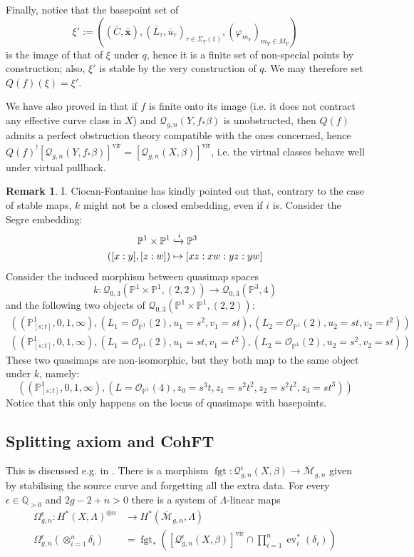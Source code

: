 \documentclass[11pt]{amsart}
\newcommand{\oM}{\overline{\mathcal{M}}}
\newcommand{\Q}[4]{\mathcal{Q}_{#1,#2}(#3,#4)}
\newcommand{\Qe}[4]{\mathcal{Q}^{\epsilon}_{#1,#2}(#3,#4)}
\newcommand{\PP}{\mathbb P}
\newcommand{\QQ}{\mathbb{Q}}
\newcommand{\OO}{\mathcal{O}}
\renewcommand{\to}{\rightarrow}
\newcommand{\virt}[1]{[#1]^{\operatorname{vir}}}
\newcommand{\fgt}{\operatorname{fgt}}
\newcommand{\ev}{\operatorname{ev}}
\theoremstyle{definition}
\theoremstyle{definition}
\newtheorem{rmk}[thm]{Remark}
\begin{document}
Finally, notice that the basepoint set of \[\xi':=\left((\bar C,\bar{\mathbf x}),(\bar L_\tau,\bar u_\tau)_{\tau\in\Sigma_Y(1)},(\varphi_{m_Y})_{m_Y\in M_Y}\right)\] is the image of that of $\xi$ under $q$, hence it is a finite set of non-special points by construction; also, $\xi'$ is stable by the very construction of $q$. We may therefore set $Q(f)(\xi)=\xi'$.

We have also proved in \cite[Lemma B.5]{BN} that if $f$ is finite onto its image (i.e. it does not contract any effective curve class in $X$) and $\Q{g}{n}{Y}{f_*\beta}$ is unobstructed, then $Q(f)$ admits a perfect obstruction theory compatible with the ones concerned, hence $Q(f)^!\virt{\Q{g}{n}{Y}{f_*\beta}}=\virt{\Q{g}{n}{X}{\beta}}$, i.e. the virtual classes behave well under virtual pullback.

\begin{rmk}
I. Ciocan-Fontanine has kindly pointed out that, contrary to the case of stable maps, $k$ might not be a closed embedding, even if $i$ is. Consider the Segre embedding:
\begin{align*}
\PP^1\times\PP^1 & \xhookrightarrow{i} \PP^3\\ 
([x:y],[z:w]) & \mapsto [xz:xw:yz:yw]\end{align*}
Consider the induced morphism between quasimap spaces
\begin{equation*} k\colon \Q{0}{3}{\PP^1\times\PP^1}{(2,2)}\to\Q{0}{3}{\PP^3}{4} \end{equation*}
and the following two objects of $\Q{0}{3}{\PP^1 \times \PP^1}{(2,2)}$:
\begin{align*}
  \left(\left(\PP^1_{[s:t]},0,1,\infty\right),\left(L_1=\OO_{\PP^1}(2),u_1=s^2 ,v_1=st\right),\left(L_2=\OO_{\PP^1}(2), u_2=st,v_2=t^2\right)\right)\\
  \left(\left(\PP^1_{[s:t]},0,1,\infty\right),\left(L_1=\OO_{\PP^1}(2),u_1=st ,v_1=t^2 \right),\left(L_2=\OO_{\PP^1}(2), u_2=s^2,v_2=st\right)\right)
\end{align*}
These two quasimaps are non-isomorphic, but they both map to the same object under $k$, namely:
 \[
   \left(\left(\PP^1_{[s:t]},0,1,\infty\right),\left(L=\OO_{\PP^1}(4),z_0=s^3t,z_1=s^2t^2,z_2=s^2t^2,z_3=st^3\right)\right)
 \]
Notice that this only happens on the locus of quasimaps with basepoints.
 \end{rmk}
\subsection{Splitting axiom and CohFT}
This is discussed e.g. in \cite[\S 2.3.3]{CF-K-higher-genus}. There is a morphism $\fgt\colon \Qe{g}{n}{X}{\beta}\to \oM_{g,n}$ given by stabilising the source curve and forgetting all the extra data. For every $\epsilon\in\QQ_{>0}$ and $2g-2+n>0$ there is a system of $\Lambda$-linear maps
\begin{align*}\Omega^\epsilon_{g,n}\colon H^*(X,\Lambda)^{\otimes n} & \to H^*(\oM_{g,n},\Lambda) \\
\Omega^\epsilon_{g,n}(\otimes_{i=1}^n\delta_i) & = \fgt_*\left(\virt{\Qe{g}{n}{X}{\beta}}\cap\prod_{i=1}^n\ev_i^*(\delta_i)\right) \end{align*}
\end{document}
